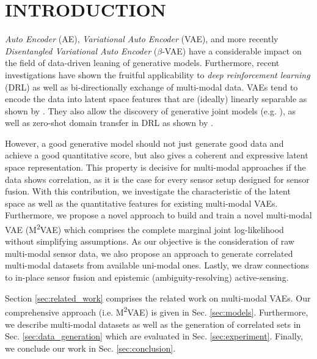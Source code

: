 \section{INTRODUCTION}
%
%
\textit{Auto Encoder} (AE), \textit{Variational Auto Encoder} (VAE), and more recently \textit{Disentangled Variational Auto Encoder} ($\beta$-VAE) have a considerable impact on the field of data-driven leaning of generative models.
%
Furthermore, recent investigations have shown the fruitful applicability to \textit{deep reinforcement learning} (DRL) as well as bi-directionally exchange of multi-modal data.
%
VAEs tend to encode the data into latent space features that are (ideally) linearly separable as shown by \cite{Higgins2017_2}.
They also allow the discovery of generative joint models (e.g. \cite{Suzuki2017}), as well as zero-shot domain transfer in DRL as shown by \cite{Higgins2017}.
%

However, a good generative model should not just generate good data and achieve a good quantitative score, but also gives a coherent and expressive latent space representation.
%
This property is decisive for multi-modal approaches if the data shows correlation, as it is the case for every sensor setup designed for sensor fusion.
%
With this contribution, we investigate the characteristic of the latent space as well as the quantitative features for existing multi-modal VAEs.
%
Furthermore, we propose a novel approach to build and train a novel multi-modal VAE (M\textsuperscript{2}VAE) which comprises the complete marginal joint log-likelihood without simplifying assumptions.
%
As our objective is the consideration of raw multi-modal sensor data, we also propose an approach to generate correlated multi-modal datasets from available uni-modal ones.
%
Lastly, we draw connections to in-place sensor fusion and epistemic (ambiguity-resolving) active-sensing.

Section \ref{sec:related_work} comprises the related work on multi-modal VAEs.
%
Our comprehensive approach (i.e. M\textsuperscript{2}VAE) is given in Sec. \ref{sec:models}.
%
Furthermore, we describe multi-modal datasets as well as the generation of correlated sets in Sec. \ref{sec:data_generation} which are evaluated in Sec. \ref{sec:experiment}.
%
Finally, we conclude our work in Sec. \ref{sec:conclusion}.



